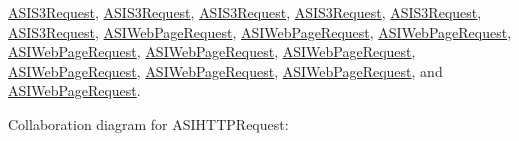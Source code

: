 \hyperlink{interface_a_s_i_s3_request}{\-A\-S\-I\-S3\-Request}, \hyperlink{interface_a_s_i_s3_request}{\-A\-S\-I\-S3\-Request}, \hyperlink{interface_a_s_i_s3_request}{\-A\-S\-I\-S3\-Request}, \hyperlink{interface_a_s_i_s3_request}{\-A\-S\-I\-S3\-Request}, \hyperlink{interface_a_s_i_s3_request}{\-A\-S\-I\-S3\-Request}, \hyperlink{interface_a_s_i_s3_request}{\-A\-S\-I\-S3\-Request}, \hyperlink{interface_a_s_i_web_page_request}{\-A\-S\-I\-Web\-Page\-Request}, \hyperlink{interface_a_s_i_web_page_request}{\-A\-S\-I\-Web\-Page\-Request}, \hyperlink{interface_a_s_i_web_page_request}{\-A\-S\-I\-Web\-Page\-Request}, \hyperlink{interface_a_s_i_web_page_request}{\-A\-S\-I\-Web\-Page\-Request}, \hyperlink{interface_a_s_i_web_page_request}{\-A\-S\-I\-Web\-Page\-Request}, \hyperlink{interface_a_s_i_web_page_request}{\-A\-S\-I\-Web\-Page\-Request}, \hyperlink{interface_a_s_i_web_page_request}{\-A\-S\-I\-Web\-Page\-Request}, \hyperlink{interface_a_s_i_web_page_request}{\-A\-S\-I\-Web\-Page\-Request}, \hyperlink{interface_a_s_i_web_page_request}{\-A\-S\-I\-Web\-Page\-Request}, and \hyperlink{interface_a_s_i_web_page_request}{\-A\-S\-I\-Web\-Page\-Request}.



\-Collaboration diagram for \-A\-S\-I\-H\-T\-T\-P\-Request\-:
